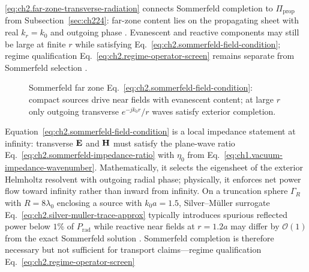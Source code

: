 \eqref{eq:ch2.far-zone-transverse-radiation} connects Sommerfeld completion to
\(\Pi_{\mathrm{prop}}\) from Subsection~\ref{sec:ch224}: far-zone content lies on
the propagating sheet with real \(k_r=k_0\) and outgoing phase
\cite{harrington2001}. Evanescent and reactive components may still be large at
finite \(r\) while satisfying Eq.~\eqref{eq:ch2.sommerfeld-field-condition}; regime
qualification Eq.~\eqref{eq:ch2.regime-operator-screen} remains separate from
Sommerfeld selection \cite{stratton1941}.
\begin{figure}[t]
\centering
{}
\caption{Sommerfeld far zone Eq.~\eqref{eq:ch2.sommerfeld-field-condition}: compact
sources drive near fields with evanescent content; at large \(r\) only outgoing
transverse \(e^{-jk_0 r}/r\) waves satisfy exterior completion.}
\label{fig:ch2.sommerfeld-far-zone}
\end{figure}
Equation~\eqref{eq:ch2.sommerfeld-field-condition} is a local impedance statement at
infinity: transverse \(\mathbf{E}\) and \(\mathbf{H}\) must satisfy the plane-wave ratio
Eq.~\eqref{eq:ch2.sommerfeld-impedance-ratio} with \(\eta_0\) from
Eq.~\eqref{eq:ch1.vacuum-impedance-wavenumber}. Mathematically, it selects the
eigensheet of the exterior Helmholtz resolvent with outgoing radial phase; physically,
it enforces net power flow toward infinity rather than inward from infinity. On a
truncation sphere \(\Gamma_R\) with \(R=8\lambda_0\) enclosing a source with \(k_0 a=1.5\),
Silver--M\"uller surrogate Eq.~\eqref{eq:ch2.silver-muller-trace-approx} typically
introduces spurious reflected power below \(1\%\) of \(P_{\mathrm{rad}}\) while reactive
near fields at \(r=1.2a\) may differ by \(\mathcal{O}(1)\) from the exact Sommerfeld solution
\cite{harrington2001}. Sommerfeld completion is therefore necessary but not
sufficient for transport claims---regime qualification Eq.~\eqref{eq:ch2.regime-operator-screen}
